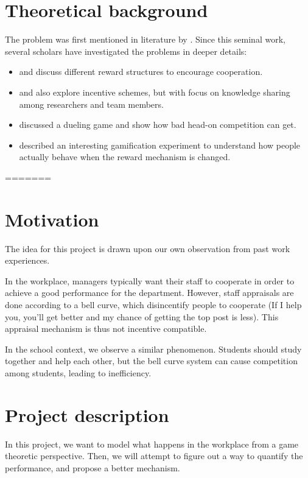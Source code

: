\documentclass[11pt, a4paper]{article}
\begin{document}
	\section{Theoretical background}
	The problem was first mentioned in literature by \cite{Drago1991}. Since this seminal work, several scholars have investigated the problems in deeper details:
	\begin{itemize}
		\item \cite{Drago1998} and \cite{Kistruck2016} discuss different reward structures to encourage cooperation.
		\item \cite{Banerjee2014} and \cite{Chakravarti2015} also explore incentive schemes, but with focus on knowledge sharing among researchers and team members.
		\item \cite{Immorlica2011} discussed a dueling game and show how bad head-on competition can get.
		\item \cite{Landers2015} described an interesting gamification experiment to understand how people actually behave when the reward mechanism is changed.		
	\end{itemize}
	
	
	
=======

\maketitle


\section{Motivation}
The idea for this project is drawn upon our own observation from past work experiences. 

In the workplace, managers typically want their staff to cooperate in order to achieve a good performance for the department. However, staff appraisals are done according to a bell curve, which disincentify people to cooperate (If I help you, you'll get better and my chance of getting the top post is less). This appraisal mechanism is thus not incentive compatible. 

In the school context, we observe a similar phenomenon. Students should study together and help each other, but the bell curve system can cause competition among students, leading to inefficiency.

\section{Project description}
In this project, we want to model what happens in the workplace from a game theoretic perspective. Then, we will attempt to figure out a way to quantify the performance, and propose a better mechanism.
\end{document}
